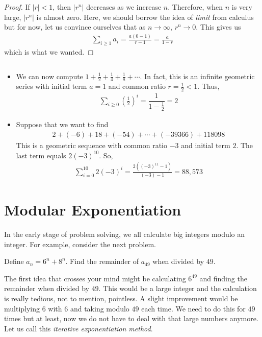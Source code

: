 \documentclass{subfile}
\begin{document}
		\begin{proof}
			If $|r|<1$, then $|r^n|$ decreases as we increase $n$. Therefore, when $n$ is very large, $|r^n|$ is almost zero. Here, we should borrow the idea of \textit{limit} from calculus but for now, let us convince ourselves that as $n\to\infty$, $r^n\to0$. This gives us
				\begin{align*}
					\sum_{i\geq1} a_i = \frac{a \left(0-1\right)}{r-1}= \frac{a}{1-r}
				\end{align*}
			which is what we wanted.
		\end{proof}

		\begin{example}
		$ $
			\begin{itemize}
				\item We can now compute $\displaystyle 	1 + \frac{1}{2}+ \frac{1}{4}+\frac{1}{8}+ \cdots$. In fact, this is an infinite geometric series with initial term $a=1$ and common ratio $r=\frac{1}{2}<1$. Thus,
					\begin{align*}
						\sum_{i\geq0} \left(\frac{1}{2}\right)^i = \dfrac{1}{1-\frac{1}{2}} = 2
					\end{align*}
				\item Suppose that we want to find
					\begin{align*}
						2 + (-6) + 18 + (-54) + \cdots + (-39366) + 118098
					\end{align*}
				This is a geometric sequence with common ratio $-3$ and initial term $2$. The last term equals $2(-3)^{10}$. So,
					\begin{align*}
						\sum_{i=0}^{10} 2(-3)^{i} = \frac{2 \left((-3)^{11} -1\right)}{(-3) - 1} = 88,573
					\end{align*}
			\end{itemize}
		\end{example}
	\section{Modular Exponentiation} \label{modexponent}
	In the early stage of problem solving, we all calculate big integers modulo an integer. For example, consider the next problem.
		\begin{problem}
			Define $a_n=6^n+8^n$. Find the remainder of $a_{49}$ when divided by $49$.
		\end{problem}
	The first idea that crosses your mind might be calculating $6^{49}$ and finding the remainder when divided by $49$. This would be a large integer and the calculation is really tedious, not to mention, pointless. A slight improvement would be multiplying $6$ with $6$ and taking modulo $49$ each time. We need to do this for $49$ times but at least, now we do not have to deal with that large numbers anymore. Let us call this \textit{iterative exponentiation method}.
\end{document}
